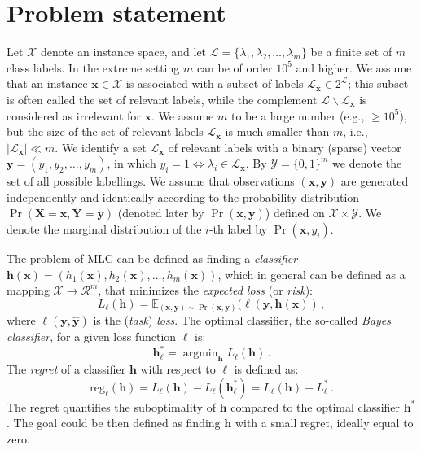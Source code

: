 \documentclass{article}
\renewcommand{\vec}[1]{\boldsymbol{#1}}
\newcommand{\bx}{\vec{x}}
\newcommand{\by}{\vec{y}}
\newcommand{\bh}{\vec{h}}
\newcommand{\bX}{\vec{X}}
\newcommand{\bY}{\vec{Y}}
\newcommand{\calX}{\mathcal{X}}
\newcommand{\calY}{\mathcal{Y}}
\newcommand{\calL}{\mathcal{L}}
\newcommand{\calR}{\mathcal{R}}
\newcommand{\reg}{\mathrm{reg}}
\newcommand{\loss}{L}
\DeclareMathOperator*{\argmin}{\arg \min}
\newcommand{\sectionBefore}{-0pt}
\newcommand{\sectionAfter}{-0pt}
\begin{document}
\vspace{\sectionBefore}
\section{Problem statement}
\label{sec:formal}
\vspace{\sectionAfter}


Let $\calX$ denote an instance space, and let $\calL = \{\lambda_1,\lambda_2, \ldots,\lambda_m\}$ be a finite set of $m$ class labels. 
In the extreme setting $m$ can be of order $10^5$ and higher.
We assume that an instance $\bx \in \calX$ is associated with a subset of
labels $\calL_{\bx} \in 2^\calL$; this subset is often called the set of relevant labels, while the complement
$\calL \backslash \calL_{\bx}$ is considered as irrelevant for $\bx$. We assume $m$ to be a large number (e.g., $\ge 10^5$), but the size of the set of relevant labels $\calL_{\bx}$ is much smaller than $m$, i.e., $|\calL_{\bx}| \ll m$. We identify a set $\calL_{\bx}$ of relevant labels with a binary (sparse)
vector $\by = (y_1,y_2, \ldots, y_m)$, in which $y_i = 1 \Leftrightarrow \lambda_i \in \calL_{\bx}$. By $\calY = \{0, 1\}^m$ we denote the set of all
possible labellings.
We assume that observations $(\bx, \by)$ are generated independently and identically according to the
probability distribution $\Pr(\bX = \bx,\bY = \by)$ (denoted later by $\Pr(\bx, \by)$) defined on $\calX \times \calY$. We denote the marginal distribution of the $i$-th label by $\Pr(\bx,y_i)$. %

The problem of MLC can be defined as finding a  \emph{classifier} $\bh(\bx) = (h_1(\bx), h_2(\bx),\ldots, h_m(\bx))$, 
which in general can be defined as a mapping $\calX \rightarrow \calR^m$, that minimizes the \emph{expected loss} (or \emph{risk}):  
$$
\loss_\ell(\bh) = \mathbb{E}_{(\bx,\by) \sim \Pr(\bx,\by)} (\ell(\by, \bh(\bx))\,,
$$
where $\ell(\by, \hat{\by})$ is the  (\emph{task}) \emph{loss}.
%
The optimal classifier,  the so-called \emph{Bayes classifier},  for a given loss function $\ell$ is:
$$
\bh^*_\ell = \argmin_{\bh}  \loss_\ell(\bh) \,.
$$
The \emph{regret} of a classifier $\bh$ with respect to $\ell$ is defined as:
 $$
\reg_\ell(\bh) = \loss_\ell(\bh) - \loss_\ell(\bh_{\ell}^*) = \loss_\ell(\bh) - \loss_\ell^* \,.
$$
The regret quantifies the suboptimality of $\bh$ compared to the optimal classifier $\bh^*$. The goal could be then defined as finding $\bh$ with a small regret, ideally equal to zero.
\end{document}
